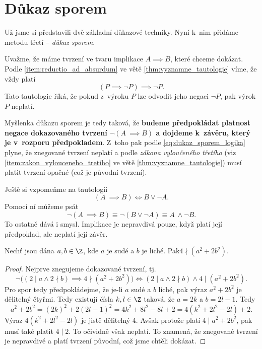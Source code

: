 \section{Důkaz sporem}\label{sec:dukaz_sporem}
Už jsme si představili dvě základní důkazové techniky. Nyní k~nim přidáme metodu třetí -- \emph{důkaz sporem}.\par
Uvažme, že máme tvrzení ve tvaru implikace $A \implies B$, které chceme dokázat. Podle \ref{item:reductio_ad_absurdum} ve větě \ref{thm:vyznamne_tautologie} víme, že vždy platí
\begin{equation}\label{eq:dukaz_sporem_logika}
    (P \implies \neg P) \implies \neg P.
\end{equation}
Tato tautologie říká, že pokud z~výroku $P$ lze odvodit jeho negaci $\neg P$, pak výrok $P$ neplatí.\par
Myšlenka důkazu sporem je tedy taková, že \textbf{budeme předpokládat platnost negace dokazovaného tvrzení $\neg (A~\implies B)$ a dojdeme k~závěru, který je v~rozporu předpokladem}. Z~toho pak podle \eqref{eq:dukaz_sporem_logika} plyne, že znegované tvrzení neplatí a podle \emph{zákona vyloučeného třetího} (viz \ref{item:zakon_vylouceneho_tretiho} ve větě \ref{thm:vyznamne_tautologie}) musí platit tvrzení opačné (což je původní tvrzení).\par
Ještě si vzpomeňme na tautologii
\begin{equation*}
    (A~\implies B) \iff B \lor \neg A.
\end{equation*}
Pomocí ní můžeme psát
\begin{equation*}
    \neg (A~\implies B) \equiv \neg (B \lor \neg A) \equiv A~\land \neg B.
\end{equation*}
To ostatně dává i smysl. Implikace je nepravdivá pouze, když platí její předpoklad, ale neplatí její závěr.
\begin{proposition}
    Nechť jsou dána $a,b\in\Z$, kde $a$ je sudé a $b$ je liché. Pak\linebreak $4 \nmid (a^2+2b^2)$.
\end{proposition}
\begin{proof}
    Nejprve znegujeme dokazované tvrzení, tj.
    \begin{equation*}
        \neg \bigl((2 \mid a \land 2 \nmid b) \implies 4 \nmid (a^2+2b^2)\bigr) \iff (2 \mid a \land 2 \nmid b) \land 4 \mid (a^2+2b^2).
    \end{equation*}
    Pro spor tedy předpokládejme, že je-li $a$ sudé a $b$ liché, pak výraz $a^2+2b^2$ je dělitelný čtyřmi. Tedy existují čísla $k,l\in\Z$ taková, že $a=2k$ a $b=2l-1$. Tedy
    \begin{equation*}
        a^2+2b^2=(2k)^2+2(2l-1)^2=4k^2+8l^2-8l+2=4(k^2+2l^2-2l)+2.
    \end{equation*}
    Výraz $4(k^2+2l^2-2l)$ je jistě dělitelný 4. Avšak protože platí $4 \mid a^2+2b^2$, pak musí také platit $4 \mid 2$. To očividně však neplatí. To znamená, že znegované tvrzení je nepravdivé a platí tvrzení původní, což jsme chtěli dokázat.
\end{proof}
